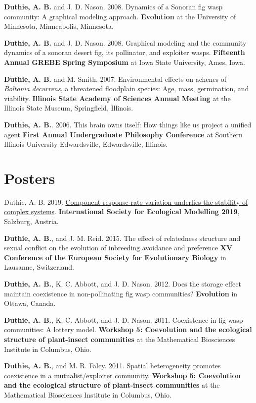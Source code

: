 \documentclass[letterpaper]{article}
\renewenvironment{itemize}{
  \begin{list}{}{
    \setlength{\leftmargin}{1.5em}
  }
}{
  \end{list}
}
\begin{document}
\begin{itemize}
\item {\bf Duthie, A. B.} and J. D. Nason. 2008. Dynamics of a Sonoran fig wasp community: A graphical modeling approach. {\bf Evolution} at the University of Minnesota, Minneapolis, Minnesota.
\item {\bf Duthie, A. B.} and J. D. Nason. 2008. Graphical modeling and the community dynamics of a sonoran desert fig, its pollinator, and exploiter wasps. {\bf Fifteenth Annual GREBE Spring Symposium} at Iowa State University, Ames, Iowa.
\item {\bf Duthie, A. B.} and M. Smith. 2007. Environmental effects on achenes of {\it Boltonia decurrens}, a threatened floodplain species: Age, mass, germination, and viability. {\bf Illinois State Academy of Sciences Annual Meeting} at the Illinois State Museum, Springfield, Illinois.
\item {\bf Duthie, A. B.}. 2006. This brain owns itself: How things like us project a unified agent {\bf First Annual Undergraduate Philosophy Conference} at Southern Illinois University Edwardsville, Edwardsville, Illinois.
\end{itemize}

\section*{Posters}
\begin{itemize}
\item {\bd Duthie, A. B.} 2019. \href{http://bradduthie.github.io/posters/duthie_ISEM_2019.pdf}{Component response rate variation underlies the stability of complex systems}. {\bf International Society for Ecological Modelling 2019}, Salzburg, Austria.
\item {\bf Duthie, A. B.}, and J. M. Reid. 2015. The effect of relatedness structure and sexual conflict on the evolution of inbreeding avoidance and preference {\bf XV Conference of the European Society for Evolutionary Biology} in Lausanne, Switzerland.
\item {\bf Duthie, A. B.}, K. C. Abbott, and J. D. Nason. 2012. Does the storage effect maintain coexistence in non-pollinating fig wasp communities? {\bf Evolution} in Ottawa, Canada.
\item {\bf Duthie, A. B.}, K. C. Abbott, and J. D. Nason. 2011. Coexistence in fig wasp communities: A lottery model. {\bf Workshop 5: Coevolution and the ecological structure of plant-insect communities} at the Mathematical Biosciences Institute in Columbus, Ohio.
\item {\bf Duthie, A. B.}, and M. R. Falcy. 2011. Spatial heterogeneity promotes coexistence in a mutualist/exploiter community. {\bf Workshop 5: Coevolution and the ecological structure of plant-insect communities} at the Mathematical Biosciences Institute in Columbus, Ohio.
\end{itemize}
\end{document}
